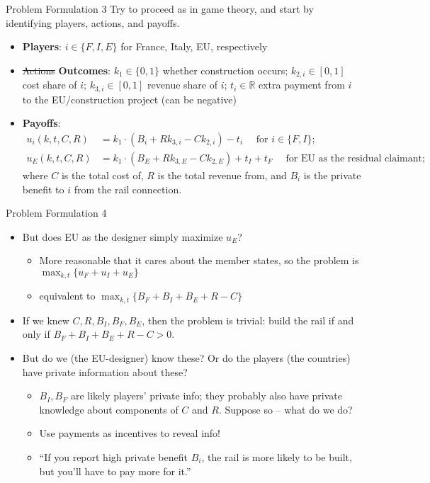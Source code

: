 \documentclass[english,10pt
,aspectratio=169
]{beamer}
\begin{document}
\begin{frame}{Problem Formulation 3}
Try to proceed as in game theory, and start by identifying {players}, {actions}, and {payoffs}.
\begin{itemize}
	\item \textbf{Players}: \alert{$i \in \{F, I, E\}$} for France, Italy, EU, respectively
	
	\item \sout{Actions} \textbf{Outcomes}: \alert{$k_1 \in \{0,1\}$} whether construction occurs; \alert{$k_{2,i} \in [0,1]$} cost share of $i$; \alert{$k_{3,i} \in [0,1]$} revenue share of $i$; \alert{$t_i \in \mathbb{R}$} extra payment from $i$ to the EU/construction project (can be negative)
	
	\item \textbf{Payoffs}: 
	\begin{align*}
		u_i(k,t,C,R) &= k_1 \cdot \left( B_i + R k_{3,i} - C k_{2,i} \right) - t_i \quad \text{ for } i \in \{F,I\};
		\\
		u_E(k,t,C,R) &= k_1 \cdot \left( B_E + R k_{3,E} - C k_{2,E} \right) + t_I + t_F \quad \text{ for EU as the residual claimant; }
	\end{align*}
	where $C$ is the total cost of, $R$ is the total revenue from, and $B_i$ is the private benefit to $i$ from the rail connection.
\end{itemize}
\end{frame}


\begin{frame}{Problem Formulation 4}
	\begin{itemize}[<+->]
		\item But does EU as the designer simply maximize $u_E$?
		\begin{itemize}
			\item More reasonable that it cares about the member states, so the problem is \alert<2>{$\max_{k,t} \{ u_F + u_I + u_E \}$}
			\item equivalent to $\max_{k,t} \{ B_F + B_I + B_E + R - C \}$
		\end{itemize}
		\item If we knew $C, R, B_I, B_F, B_E$, then the problem is trivial: build the rail if and only if $B_F + B_I + B_E + R - C > 0$.
		\item But do we (the EU-designer) know these? Or do the players (the countries) have private information about these?
		\begin{itemize}
			\item $B_I, B_F$ are likely players' private info; they probably also have private knowledge about components of $C$ and $R$. Suppose so -- what do we do?
			\item Use payments as incentives to reveal info!
			\item ``If you report high private benefit $B_i$, the rail is more likely to be built, but you'll have to pay more for it.''
		\end{itemize}
	\end{itemize}
\end{frame}
\end{document}
